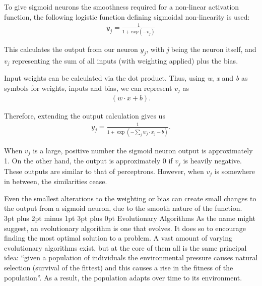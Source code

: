 \documentclass[12pt,a4paper]{article}
\makeatletter
\renewcommand\subsection{\@startsection {subsection}{1}{2mm} %
                               {3pt plus 2pt minus 1pt} %
                               {3pt plus 0pt} %
                               {\normalfont\bfseries}}
\makeatother
\begin{document}
To give sigmoid neurons the smoothness required for a non-linear activation function, the following logistic function defining sigmoidal non-linearity is used:
\begin{eqnarray}
y_j = \frac{1}{1+exp(-v_j)}
\end{eqnarray}

\begin{center}
	\citep[Chapter 4, page 179] {NeuralNetworksAComprehensiveFoundation}
\end{center}

This calculates the output from our neuron \textit{{$y_j$}}, with \textit{j} being the neuron itself, and \textit{$v_j$} representing the sum of all inputs (with weighting applied) plus the bias\citep{NeuralNetworksAComprehensiveFoundation}.

Input weights can be calculated via the dot product. Thus, using \textit{w}, \textit{x} and \textit{b} as symbols for weights, inputs and bias, we can represent $v_j$ as 
\begin{eqnarray}
(w \cdot x+b).
\end{eqnarray}

\begin{center}
	\citep{NeuralNetworksAndDeepLearning}
\end{center}

Therefore, extending the output calculation gives us
\begin{eqnarray} 
y_j = \frac{1}{1+\exp(-\sum_j w_j \cdot x_j - b)}.
\end{eqnarray}


When $v_j$ is a large, positive number the sigmoid neuron output is approximately 1. On the other hand, the output is approximately 0 if $v_j$ is heavily negative. These outputs are similar to that of perceptrons. However, when $v_j$ is somewhere in between, the similarities cease. 

Even the smallest alterations to the weighting or bias can create small changes to the output from a sigmoid neuron, due to the smooth nature of the function\citep{NeuralNetworksAndDeepLearning}.\\

\subsection{Evolutionary Algorithms}
As the name might suggest, an evolutionary algorithm is one that evolves. It does so to encourage finding the most optimal solution to a problem. A vast amount of varying evolutionary algorithms exist, but at the core of them all is the same principal idea: \enquote{given a population of individuals the environmental pressure causes natural selection (survival of the fittest) and this causes a rise in the fitness of the population}\citep{IntroductionToEvolutionaryComputing}. As a result, the population adapts over time to its environment. 
\end{document}
